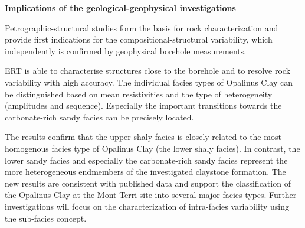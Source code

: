 \textbf{Implications of the geological-geophysical investigations}

Petrographic-structural studies form the basis for rock characterization and provide first indications for the compositional-structural variability, which independently is confirmed by geophysical borehole measurements.

ERT is able to characterise structures close to the borehole and to resolve rock variability with high accuracy. The individual facies types of Opalinus Clay can be distinguished based on mean resistivities and the type of heterogeneity (amplitudes and sequence). Especially the important transitions towards the carbonate-rich sandy facies can be precisely located.

The results confirm that the upper shaly facies is closely related to the most homogenous facies type of Opalinus Clay (the lower shaly facies). In contrast, the lower sandy facies and especially the carbonate-rich sandy facies represent the more heterogeneous endmembers of the investigated claystone formation.
The new results are consistent with published data and support the classification of the Opalinus Clay at the Mont Terri site into several major facies types. Further investigations will focus on the characterization of intra-facies variability using the sub-facies concept.



